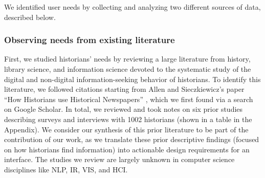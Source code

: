 We identified user needs by collecting and analyzing two different sources of data, described below.

\subsubsection{Observing needs from existing literature}
First, we studied historians' needs by reviewing a large literature from history, library science, and information science devoted to the systematic study of the digital and non-digital information-seeking behavior of historians.
To identify this literature, we followed citations starting from Allen and Sieczkiewicz's paper ``How Historians use Historical Newspapers'' \cite{allen}, which we first found via a search on Google Scholar. In total, we reviewed and took notes on six prior studies describing surveys and interviews with 1002 historians (shown in a table in the Appendix).
We consider our synthesis of this prior literature to be part of the contribution of our work, as we translate these prior descriptive findings (focused on how historians find information) into actionable design requirements for an interface.
The studies we review are largely unknown in computer science disciplines like NLP, IR, VIS, and HCI.

